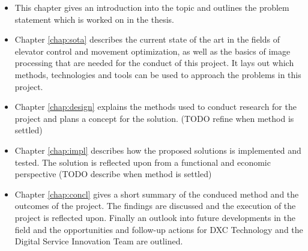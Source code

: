 \begin{itemize}
    \item This chapter gives an introduction into the topic and outlines the problem statement which is worked on in the thesis.
    \item Chapter \ref{chap:sota} describes the current state of the art in the fields of elevator control and movement optimization, as well as the basics of image processing that are needed for the conduct of this project. It lays out which methods, technologies and tools can be used to approach the problems in this project.
    \item Chapter \ref{chap:design} explains the methods used to conduct research for the project and plans a concept for the solution. (TODO refine when method is settled)
    \item Chapter \ref{chap:impl} describes how the proposed solutions is implemented and tested. The solution is reflected upon from a functional and economic perspective  (TODO describe when method is settled)
    \item Chapter \ref{chap:concl} gives a short summary of the conduced method and the outcomes of the project. The findings are discussed and the execution of the project is reflected upon. Finally an outlook into future developments in the field and the opportunities and follow-up actions for DXC Technology and the Digital Service Innovation Team are outlined.
\end{itemize}